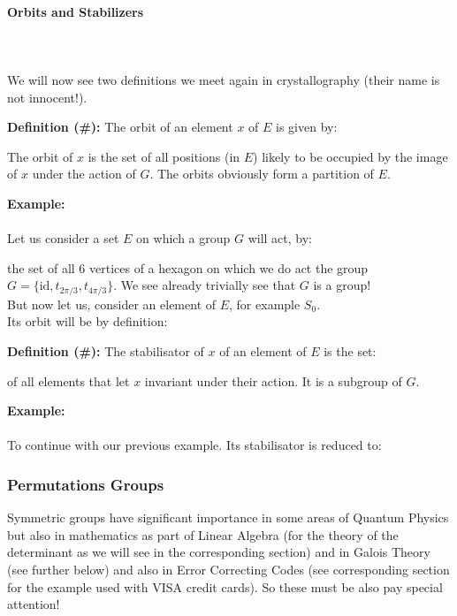 	\pagebreak
	\paragraph{Orbits and Stabilizers}\mbox{}\\\\
	We will now see two definitions we meet again in crystallography (their name is not innocent!).
	
	\textbf{Definition (\#\mydef):} The orbit of an element $x$ of $E$ is given by:
	
	The orbit of $x$ is the set of all positions (in $E$) likely to be occupied by the image of $x$ under the action of $G$. The orbits obviously form a partition of $E$.
	\begin{tcolorbox}[colframe=black,colback=white,sharp corners]
	\textbf{{\Large {}}Example:}\\\\
	Let us consider a set $E$ on which a group $G$ will act, by:
	
	the set of all $6$ vertices of a hexagon on which we do act the group $G=\{\text{id},t_{2\pi/3},t_{4\pi/3}\}$. We see already trivially see that $G$ is a group!  \\
	
	But now let us, consider an element of $E$, for example $S_0$.\\
	
	Its orbit will be by definition:
	
	\end{tcolorbox}
	\textbf{Definition (\#\mydef):} The stabilisator of $x$ of an element of $E$ is the set:
	
	of all elements that let $x$ invariant under their action. It is a subgroup of $G$.
	\begin{tcolorbox}[colframe=black,colback=white,sharp corners]
	\textbf{{\Large {}}Example:}\\\\
	To continue with our previous example. Its stabilisator is reduced to:
	
	\end{tcolorbox}
	
	
	\pagebreak
	\subsubsection{Permutations Groups}
	Symmetric groups have significant importance in some areas of Quantum Physics but also in mathematics as part of Linear Algebra (for the theory of the determinant as we will see in the corresponding section) and in Galois Theory (see further below) and also in Error Correcting Codes (see corresponding section for the example used with VISA credit cards). So these must be also pay special attention!
	
